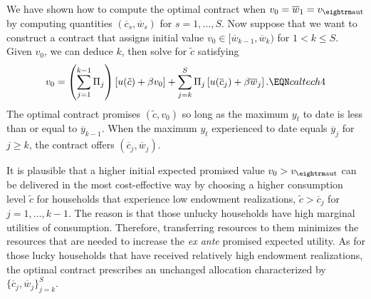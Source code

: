 

\medskip
{}
\smallskip

\noindent
  We have shown how to compute the optimal contract when
$v_0 = \overline w_1 = v_{\rm aut} $ by computing %
quantities $(\overline c_s, \overline w_s)$
for $s=1, \ldots, S$.  Now   suppose that we  want
to construct a contract that assigns initial
value $v_0 \in [\overline w_{k-1}, \overline w_k)$ for $1
< k \leq S$.  %
  Given $v_0$, we
can deduce $k$, then solve for $\tilde c$ satisfying
$$ v_0 = \left( \sum_{j=1}^{k-1} \Pi_j \right)
  \left[u(\tilde c) + \beta v_0 \right]
  + \sum_{j=k}^S \Pi_j \left[u(\overline c_j) + \beta \overline w_j \right].
  \EQN caltech4 $$
The optimal  contract promises $(\tilde c, v_0)$ so long
as the maximum $y_t$ to date is less than or equal to
$\overline y_{k -1}$.  When the maximum $y_t$ experienced
to date equals $ \overline y_j$ for $j \geq k$, the contract offers
$(\overline c_j, \overline w_j)$.

It is plausible that a higher initial expected promised value
$v_0> v_{\rm aut}$ can be  delivered  in the most cost-effective way by choosing a
higher consumption level $\tilde c$ for households that experience low endowment
realizations, $\tilde c > \overline c_j$ for $j=1, \ldots, k-1$.  The reason is that
those unlucky households have high marginal utilities of consumption. Therefore,  transferring
resources  to them  minimizes the resources that are needed to increase
 the {\it ex ante\/}
promised expected utility. As for those lucky households that have received
relatively high endowment realizations, the optimal contract prescribes
an unchanged allocation characterized by
$\{\overline c_j, \overline w_j\}_{j=k}^S$.

